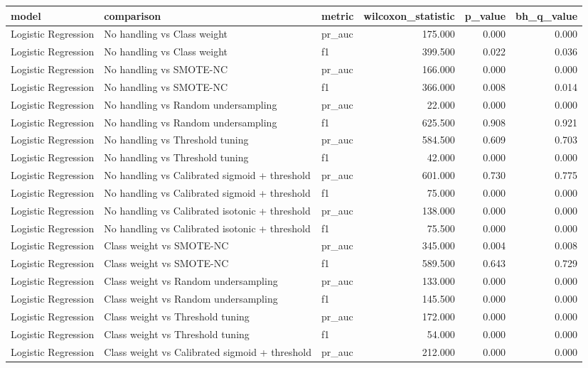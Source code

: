 \begin{tabular}{lllrrr}
\toprule
model & comparison & metric & wilcoxon_statistic & p_value & bh_q_value \\
\midrule
Logistic Regression & No handling vs Class weight & pr_auc & 175.000 & 0.000 & 0.000 \\
Logistic Regression & No handling vs Class weight & f1 & 399.500 & 0.022 & 0.036 \\
Logistic Regression & No handling vs SMOTE-NC & pr_auc & 166.000 & 0.000 & 0.000 \\
Logistic Regression & No handling vs SMOTE-NC & f1 & 366.000 & 0.008 & 0.014 \\
Logistic Regression & No handling vs Random undersampling & pr_auc & 22.000 & 0.000 & 0.000 \\
Logistic Regression & No handling vs Random undersampling & f1 & 625.500 & 0.908 & 0.921 \\
Logistic Regression & No handling vs Threshold tuning & pr_auc & 584.500 & 0.609 & 0.703 \\
Logistic Regression & No handling vs Threshold tuning & f1 & 42.000 & 0.000 & 0.000 \\
Logistic Regression & No handling vs Calibrated sigmoid + threshold & pr_auc & 601.000 & 0.730 & 0.775 \\
Logistic Regression & No handling vs Calibrated sigmoid + threshold & f1 & 75.000 & 0.000 & 0.000 \\
Logistic Regression & No handling vs Calibrated isotonic + threshold & pr_auc & 138.000 & 0.000 & 0.000 \\
Logistic Regression & No handling vs Calibrated isotonic + threshold & f1 & 75.500 & 0.000 & 0.000 \\
Logistic Regression & Class weight vs SMOTE-NC & pr_auc & 345.000 & 0.004 & 0.008 \\
Logistic Regression & Class weight vs SMOTE-NC & f1 & 589.500 & 0.643 & 0.729 \\
Logistic Regression & Class weight vs Random undersampling & pr_auc & 133.000 & 0.000 & 0.000 \\
Logistic Regression & Class weight vs Random undersampling & f1 & 145.500 & 0.000 & 0.000 \\
Logistic Regression & Class weight vs Threshold tuning & pr_auc & 172.000 & 0.000 & 0.000 \\
Logistic Regression & Class weight vs Threshold tuning & f1 & 54.000 & 0.000 & 0.000 \\
Logistic Regression & Class weight vs Calibrated sigmoid + threshold & pr_auc & 212.000 & 0.000 & 0.000 \\

\end{tabular}
